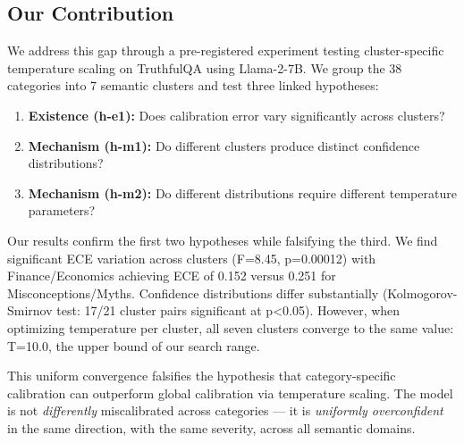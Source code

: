 \subsection{Our Contribution}

We address this gap through a pre-registered experiment testing cluster-specific temperature scaling on TruthfulQA using Llama-2-7B. We group the 38 categories into 7 semantic clusters and test three linked hypotheses:

\begin{enumerate}
    \item \textbf{Existence (h-e1):} Does calibration error vary significantly across clusters?
    \item \textbf{Mechanism (h-m1):} Do different clusters produce distinct confidence distributions?
    \item \textbf{Mechanism (h-m2):} Do different distributions require different temperature parameters?
\end{enumerate}

Our results confirm the first two hypotheses while falsifying the third. We find significant ECE variation across clusters (F=8.45, p=0.00012) with Finance/Economics achieving ECE of 0.152 versus 0.251 for Misconceptions/Myths. Confidence distributions differ substantially (Kolmogorov-Smirnov test: 17/21 cluster pairs significant at p<0.05). However, when optimizing temperature per cluster, all seven clusters converge to the same value: T=10.0, the upper bound of our search range.

This uniform convergence falsifies the hypothesis that category-specific calibration can outperform global calibration via temperature scaling. The model is not \emph{differently} miscalibrated across categories --- it is \emph{uniformly overconfident} in the same direction, with the same severity, across all semantic domains.
